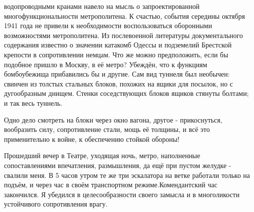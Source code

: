 \label{240-1}
водопроводными кранами навело на мысль о запроектированной многофункциональности метрополитена. К счастью, события середины октября 1941 года не привели к необходимости воспользоваться оборонными возможностями метрополитена. Из послевоенной литературы документального содержания известно о значении катакомб Одессы и подземелий Брестской крепости в сопротивлении немцам. Что же можно предположить, если бы подобное пришло в Москву, в её метро? Убеждён, что к функциям бомбоубежища прибавились бы и другие. Сам вид туннеля был необычен: свинчен из толстых стальных блоков, похожих на ящики для посылок, но с дугообразным днищем. Стенки соседствующих блоков ящиков стянуты болтами; и так весь туннель.

\label{241-1}
Одно дело смотреть на блоки через окно вагона, другое - прикоснуться, вообразить силу, сопротивление стали, мощь её толщины, и всё это применительно к войне, к обеспечению стойкой обороны!

Прошедший вечер в Театре, уходящая ночь, метро, наполненные сопоставлениями впечатления, размышления, да ещё при пустом желудке - свалили меня. В 5 часов утром те же три эскалатора на ветке работали только на подъём, и через час в своём транспортном режиме.Комендантский час закончился. Я убедился в целесообразности своего замысла и в многоликости устойчивого сопротивления врагу.
